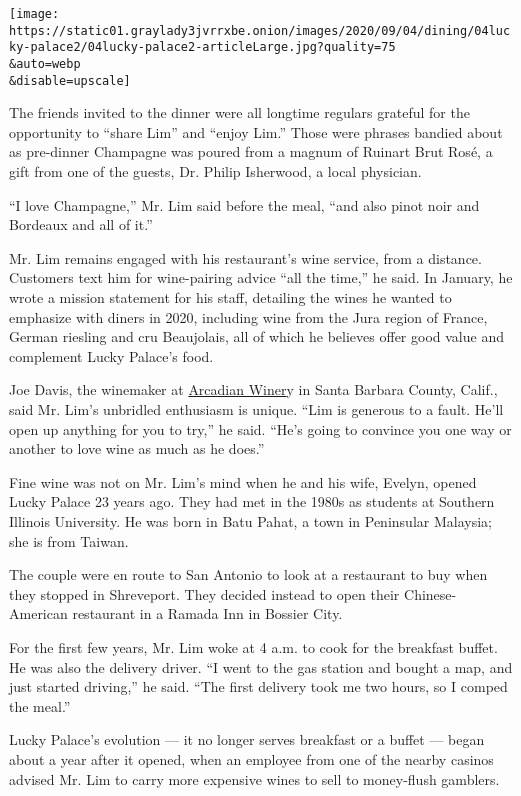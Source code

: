 \texttt{[image: https://static01.graylady3jvrrxbe.onion/images/2020/09/04/dining/04lucky-palace2/04lucky-palace2-articleLarge.jpg?quality=75\\\&auto=webp\\\&disable=upscale]}

The friends invited to the dinner were all longtime regulars grateful
for the opportunity to ``share Lim'' and ``enjoy Lim.'' Those were
phrases bandied about as pre-dinner Champagne was poured from a magnum
of Ruinart Brut Rosé, a gift from one of the guests, Dr. Philip
Isherwood, a local physician.

``I love Champagne,'' Mr. Lim said before the meal, ``and also pinot
noir and Bordeaux and all of it.''

Mr. Lim remains engaged with his restaurant's wine service, from a
distance. Customers text him for wine-pairing advice ``all the time,''
he said. In January, he wrote a mission statement for his staff,
detailing the wines he wanted to emphasize with diners in 2020,
including wine from the Jura region of France, German riesling and cru
Beaujolais, all of which he believes offer good value and complement
Lucky Palace's food.

Joe Davis, the winemaker at
\href{http://www.princeofpinot.com/winery/300/}{Arcadian Winer}y in
Santa Barbara County, Calif., said Mr. Lim's unbridled enthusiasm is
unique. ``Lim is generous to a fault. He'll open up anything for you to
try,'' he said. ``He's going to convince you one way or another to love
wine as much as he does.''

Fine wine was not on Mr. Lim's mind when he and his wife, Evelyn, opened
Lucky Palace 23 years ago. They had met in the 1980s as students at
Southern Illinois University. He was born in Batu Pahat, a town in
Peninsular Malaysia; she is from Taiwan.

The couple were en route to San Antonio to look at a restaurant to buy
when they stopped in Shreveport. They decided instead to open their
Chinese-American restaurant in a Ramada Inn in Bossier City.

For the first few years, Mr. Lim woke at 4 a.m. to cook for the
breakfast buffet. He was also the delivery driver. ``I went to the gas
station and bought a map, and just started driving,'' he said. ``The
first delivery took me two hours, so I comped the meal.''

Lucky Palace's evolution --- it no longer serves breakfast or a buffet
--- began about a year after it opened, when an employee from one of the
nearby casinos advised Mr. Lim to carry more expensive wines to sell to
money-flush gamblers.

